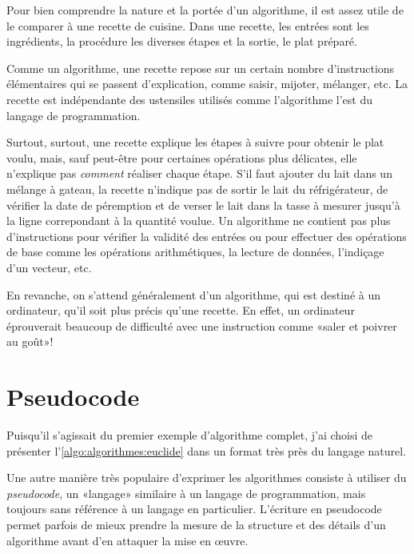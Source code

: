 Pour bien comprendre la nature et la portée d'un algorithme, il est
assez utile de le comparer à une recette de cuisine. Dans une recette,
les entrées sont les ingrédients, la procédure les diverses étapes et
la sortie, le plat préparé.

Comme un algorithme, une recette repose sur un certain nombre
d'instructions élémentaires qui se passent d'explication, comme
saisir, mijoter, mélanger, etc. La recette est indépendante des
ustensiles utilisés comme l'algorithme l'est du langage de
programmation.

Surtout, surtout, une recette explique les étapes à suivre pour
obtenir le plat voulu, mais, sauf peut-être pour certaines opérations
plus délicates, elle n'explique pas \emph{comment} réaliser chaque
étape. S'il faut ajouter du lait dans un mélange à gateau, la recette
n'indique pas de sortir le lait du réfrigérateur, de vérifier la date
de péremption et de verser le lait dans la tasse à mesurer jusqu'à la
ligne correpondant à la quantité voulue. Un algorithme ne contient pas
plus d'instructions pour vérifier la validité des entrées ou pour
effectuer des opérations de base comme les opérations arithmétiques,
la lecture de données, l'indiçage d'un vecteur, etc.

En revanche, on s'attend généralement d'un algorithme, qui est destiné
à un ordinateur, qu'il soit plus précis qu'une recette. En effet, un
ordinateur éprouverait beaucoup de difficulté avec une instruction
comme «saler et poivrer au goût»!



\section{Pseudocode}
\label{sec:algorithmes:pseudocode}

Puisqu'il s'agissait du premier exemple d'algorithme complet, j'ai
choisi de présenter l'\autoref{algo:algorithmes:euclide} dans un
format très près du langage naturel.

Une autre manière très populaire d'exprimer les algorithmes consiste à
utiliser du \emph{pseudocode}, un «langage»
similaire à un langage de programmation, mais toujours sans référence
à un langage en particulier. L'écriture en pseudocode permet parfois
de mieux prendre la mesure de la structure et des détails d'un
algorithme avant d'en attaquer la mise en œuvre.

